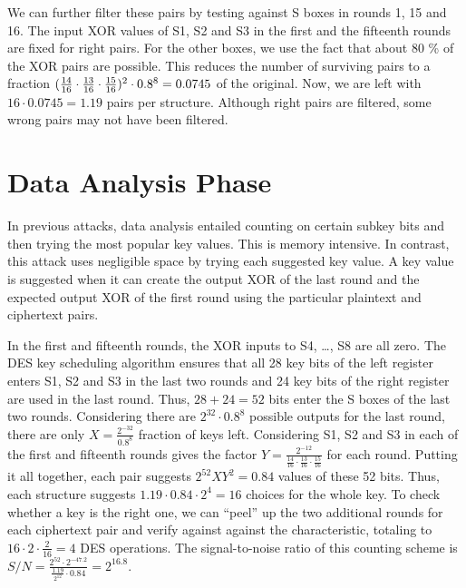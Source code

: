 \documentclass[twoside]{article}
\begin{document}
We can further filter these pairs by testing against S boxes in rounds 1, 15 and
16. The input XOR values of S1, S2 and S3 in the first and the fifteenth rounds
are fixed for right pairs. For the other boxes, we use the fact that about 80 \%
of the XOR pairs are possible. This reduces the number of surviving pairs to a
fraction \((\frac{14}{16} \cdot \frac{13}{16} \cdot \frac{15}{16})^2 \cdot
0.8^8 = 0.0745\) of the original. Now, we are left with \(16 \cdot 0.0745 =
1.19\) pairs per structure. Although right pairs are filtered, some wrong pairs
may not have been filtered.

\section{Data Analysis Phase}

In previous attacks, data analysis entailed counting on certain subkey bits and
then trying the most popular key values. This is memory intensive. In contrast,
this attack uses negligible space by trying each suggested key value. A key
value is suggested when it can create the output XOR of the last round and the
expected output XOR of the first round using the particular plaintext and
ciphertext pairs.

In the first and fifteenth rounds, the XOR inputs to S4, \dots, S8 are all zero.
The DES key scheduling algorithm ensures that all 28 key bits of the left
register enters S1, S2 and S3 in the last two rounds and 24 key bits of the
right register are used in the last round. Thus, \(28 + 24 = 52\) bits enter the
S boxes of the last two rounds. Considering there are \(2^{32} \cdot 0.8^8\)
possible outputs for the last round, there are only \(X =
\frac{2^{-32}}{0.8^8}\) fraction of keys left. Considering S1, S2 and S3 in each
of the first and fifteenth rounds gives the factor \(Y =
\frac{2^{-12}}{\frac{14}{16}\cdot\frac{13}{16}\cdot\frac{15}{16}}\) for each
round. Putting it all together, each pair suggests \(2^{52}XY^2 = 0.84\) values
of these 52 bits. Thus, each structure suggests \(1.19 \cdot 0.84 \cdot 2^4 =
16\) choices for the whole key. To check whether a key is the right one, we can
``peel'' up the two additional rounds for each ciphertext pair and verify
against against the characteristic, totaling to \(16 \cdot 2 \cdot \frac{2}{16}
= 4\) DES operations. The signal-to-noise ratio of this counting scheme is \(S/N
= \frac{2^{52} \cdot 2^{-47.2}}{\frac{1.19}{2^{12}} \cdot 0.84} = 2^{16.8}\).
\end{document}
